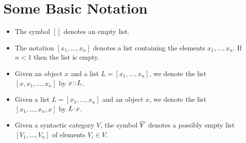 \section{Some Basic Notation}
\begin{itemize}
\item  The symbol $[]$ denotes an empty list.
\item The notation $[x_1, \ldots, x_n]$ denotes
  a list containing the elements $x_1, \ldots, x_n$.  If $n<1$ then the list
  is empty.
\item Given an object $x$ and a list $L = [x_1,\ldots, x_n]$,
we denote the list $[x,x_1,\ldots, x_n]$ by $x \mathbin{\!::\!} L$.
\item Given a list $L = [x_1, \ldots, x_n]$ and an object $x$,
we denote the list $[x_1, \ldots, x_n, x]$ by $L \mathbin{\!\cdot\!} x$.
\item Given a syntactic category $V$, the symbol $\overline{V}$ denotes a
  possibly empty list $[V_1,\ldots, V_n]$ of elements $V_i \in V$.
\end{itemize}
